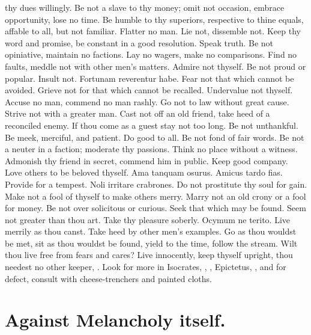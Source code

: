 {thy dues willingly. Be not a slave to thy money; omit not
occasion, embrace opportunity, lose no time. Be humble to thy
superiors, respective to thine equals, affable to all, but not
familiar. Flatter no man. Lie not, dissemble not. Keep thy word
and promise, be constant in a good resolution. Speak truth. Be not
opiniative, maintain no factions. Lay no wagers, make no comparisons.
Find no faults, meddle not with other men's matters. Admire not
thyself. Be not proud or popular. Insult not. Fortunam reverentur
habe. Fear not that which cannot be avoided.  Grieve not
for that which cannot be recalled. Undervalue not thyself.
Accuse no man, commend no man rashly. Go not to law without great
cause. Strive not with a greater man. Cast not off an old friend, take
heed of a reconciled enemy. If thou come as a guest stay not too
long. Be not unthankful. Be meek, merciful, and patient. Do good to
all. Be not fond of fair words. Be not a neuter in a faction;
moderate thy passions. Think no place without a witness. 
Admonish thy friend in secret, commend him in public. Keep good
company. Love others to be beloved thyself. Ama tanquam osurus.
Amicus tardo fias. Provide for a tempest. Noli irritare crabrones. Do
not prostitute thy soul for gain. Make not a fool of thyself to make
others merry. Marry not an old crony or a fool for money. Be not over
solicitous or curious. Seek that which may be found. Seem not greater
than thou art. Take thy pleasure soberly. Ocymum ne terito. Live
merrily as thou canst. Take heed by other men's examples. Go as
thou wouldst be met, sit as thou wouldst be found, yield to the
time, follow the stream. Wilt thou live free from fears and cares?
Live innocently, keep thyself upright, thou needest no other
keeper, \etc{}. Look for more in Isocrates, \Seneca, \Plutarch, Epictetus,
\etc{}, and for defect, consult with cheese-trenchers and painted cloths.


\section{Against Melancholy itself.}

}
